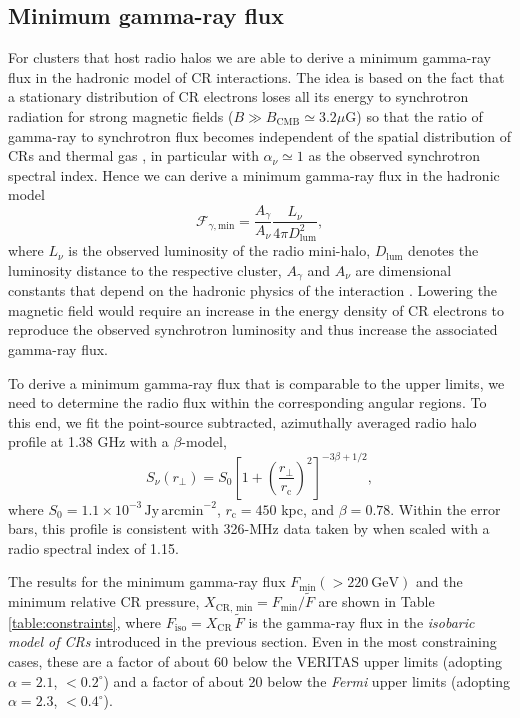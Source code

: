 \documentclass[12pt,manuscript]{aastex}
\newcommand{\rmn}{\mathrm}
\newcommand{\CR}{\mathrm{CR}}
\newcommand{\dps}{\displaystyle}
\begin{document}
\subsection{Minimum gamma-ray flux}
For clusters that host radio halos we are able to derive a minimum gamma-ray flux in the hadronic model of CR interactions. The idea is based on the fact that a stationary distribution of CR electrons loses all its energy to synchrotron radiation for strong magnetic fields ($B \gg B_{\rmn{CMB}} \simeq 3.2 \mu$G) so that the ratio of gamma-ray to synchrotron flux becomes independent of the spatial distribution of CRs and thermal gas \citep{article:Voelk:1989, article:Pohl:1994, article:Pfrommer:2008}, in particular with $\alpha_{\nu}\simeq 1$ as the observed synchrotron spectral index.  Hence we can derive a minimum gamma-ray flux in the hadronic model
\begin{equation}
\label{eq:Fmin}
\mathcal{F}_{\gamma,\rmn{min}} = \frac{\dps A_{\gamma}}{\dps A_{\nu}}\frac{\dps L_{\nu}}{\dps 4\pi D_{\rmn{lum}}^{2}},
\end{equation}
where $L_{\nu}$ is the observed luminosity of the radio mini-halo, $D_{\rmn{lum}}$ denotes the luminosity distance to the respective cluster, $A_\gamma$ and $A_\nu$ are dimensional constants that depend on the hadronic physics of the interaction \citep{article:Pfrommer:2008, Pfrommer_etal:2008}. Lowering the magnetic field would require an increase in the energy density of CR electrons to reproduce the observed synchrotron luminosity and thus increase the associated gamma-ray flux.

To derive a minimum gamma-ray flux that is comparable to the upper limits, we need to determine the radio flux within the corresponding angular regions. To this end, we fit the point-source subtracted, azimuthally averaged radio halo profile at 1.38 GHz \citep{article:Deiss_etal:1997} with a $\beta$-model,
\begin{equation}
\label{beta}
 S_{\nu} (r_{\bot})= S_{0} \left[ 1 + \left( \frac{r_{\bot}}{r_{\rmn{c}}}\right)^{2}\right]^{-3\beta + 1/2},
\end{equation}
where $S_{0} = 1.1 \times 10^{-3}\,\rmn{Jy\,arcmin}^{-2}$, $r_{\rmn{c}} = 450$ kpc, and $\beta = 0.78$.  Within the error bars, this profile is consistent with 326-MHz data taken by \citet{article:Govoni_etal:2001} when scaled with a radio spectral index of 1.15. 

The results for the minimum gamma-ray flux $F_{\rmn{min}}(>220~\rmn{GeV})$ and the minimum relative CR pressure, $X_{\CR,\,\rmn{min}} = F_{\rmn{min}}/\tilde{F}$ are shown in Table \ref{table:constraints}, where $F_\rmn{iso} = X_\CR\,\tilde{F}$ is the gamma-ray flux in the {\em isobaric model of CRs} introduced in the previous section. Even in the most constraining cases, these are a factor of about 60 below the VERITAS upper limits (adopting $\alpha=2.1$, $<0.2^{\circ}$) and a factor of about 20 below the {\em Fermi} upper limits (adopting $\alpha=2.3$, $<0.4^{\circ}$).
\end{document}
